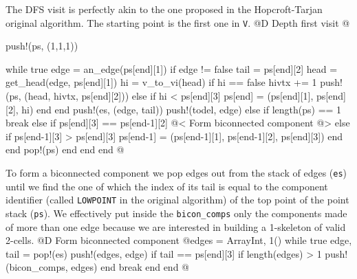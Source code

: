 \documentclass[10pt,oneside]{article}
\begin{document}
The DFS visit is perfectly akin to the one proposed in the Hopcroft-Tarjan original algorithm.
The starting point is the first one in \texttt{V}.
@D Depth first visit
@{push!(ps, (1,1,1))

while true
    edge = an_edge(ps[end][1])
    if edge != false
        tail = ps[end][2]
        head = get_head(edge, ps[end][1])
        hi = v_to_vi(head)
        if hi == false
            hivtx += 1
            push!(ps, (head, hivtx, ps[end][2]))
        else
            if hi < ps[end][3]
                ps[end] = (ps[end][1], ps[end][2], hi)
            end
        end
        push!(es, (edge, tail))
        push!(todel, edge)
    else
        if length(ps) == 1
            break
        else
            if ps[end][3] == ps[end-1][2]
                @< Form biconnected component @>
            else
                if ps[end-1][3] > ps[end][3]
                    ps[end-1] = (ps[end-1][1], ps[end-1][2], ps[end][3])
                end
            end
            pop!(ps)
        end
    end
end
@}
To form a biconnected component we pop edges out from the stack of edges (\texttt{es}) until we find the one
of which the index of its tail is equal to the component identifier (called \texttt{LOWPOINT} in the original algorithm) 
of the top point of the point stack (\texttt{ps}). We effectively put inside the \texttt{bicon\_comps} only the components
made of more than one edge because we are interested in building a 1-skeleton of valid 2-cells.
@D Form biconnected component
@{edges = Array{Int, 1}()
while true
    edge, tail = pop!(es)
    push!(edges, edge)
    if tail == ps[end][3]
        if length(edges) > 1
            push!(bicon_comps, edges)
        end
        break
    end
end
@}

\end{document}
